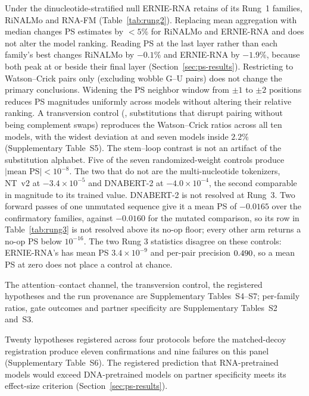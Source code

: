 \documentclass[11pt]{article}
\begin{document}
Under the dinucleotide-stratified null ERNIE-RNA retains \retainErnieRNA{} of
its Rung~1 families, RiNALMo \retainRiNALMo{} and RNA-FM \retainRNAFM{}
(Table~\ref{tab:rung2}). Replacing
mean aggregation with median changes PS estimates by $< 5$\% for RiNALMo
and ERNIE-RNA and does not alter the model ranking. Reading PS at the last
layer rather than each family's best changes RiNALMo by $-0.1$\% and ERNIE-RNA
by $-1.9$\%, because both peak at or beside their final layer
(Section~\ref{sec:ps-results}). Restricting to Watson--Crick pairs only (excluding wobble G--U
pairs) does not change the primary conclusions. Widening the PS neighbor
window from $\pm 1$ to $\pm 2$ positions reduces PS magnitudes uniformly
across models without altering their relative ranking.
A transversion control (\transversionAlphabet{}, substitutions that disrupt
pairing without being complement swaps) reproduces the Watson--Crick ratios
across all ten models, with the widest deviation \transversionWidestDeviation{}
at \transversionWidest{} and seven models inside $2.2$\%
(Supplementary Table~S5). The stem--loop contrast is not an artifact of
the substitution alphabet. Five of the seven randomized-weight
controls produce $|\text{mean PS}| < 10^{-8}$. The two that do not are the
multi-nucleotide tokenizers, NT~v2 at $-3.4 \times 10^{-5}$ and DNABERT-2 at
$-4.0 \times 10^{-4}$, the second comparable in magnitude to its trained value.
DNABERT-2 is not resolved at Rung~3. Two forward passes of one unmutated
sequence give it a mean PS of $-0.0165$ over the \confirmatoryN{} confirmatory
families, against $-0.0160$ for the mutated comparison, so its row in
Table~\ref{tab:rung3} is not resolved above its no-op floor; every other arm
returns a no-op PS below $10^{-16}$.
The two Rung 3 statistics disagree on these controls: ERNIE-RNA's has mean PS
$3.4 \times 10^{-9}$ and per-pair precision
$0.490{}$, so a mean PS at zero does
not place a control at chance.

The attention--contact channel, the transversion control, the registered
hypotheses and the run provenance are Supplementary Tables~S4--S7; per-family
ratios, gate outcomes and partner specificity are Supplementary Tables~S2
and~S3.


Twenty hypotheses registered across four protocols before the matched-decoy
registration produce eleven confirmations and nine failures on this panel
(Supplementary Table~S6). The registered prediction that RNA-pretrained models
would exceed DNA-pretrained models on partner specificity meets its effect-size
criterion (Section~\ref{sec:ps-results}).
\end{document}
